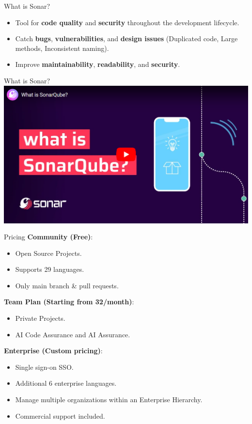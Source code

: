 \documentclass{beamer}
\begin{document}
\begin{frame}{What is Sonar?}
  \begin{itemize}
    \item Tool for \textbf{code quality} and \textbf{security} throughout the development lifecycle.
    \vspace*{0.75em}
    \item Catch \textbf{bugs}, \textbf{vulnerabilities}, and \textbf{design issues} 
    (Duplicated code, Large methods, Inconsistent naming).
    \vspace*{0.75em}
    \item Improve \textbf{maintainability}, \textbf{readability}, and \textbf{security}.
  \end{itemize}
\end{frame}

\begin{frame}{What is Sonar?}
  \href{https://youtu.be/xeTwG9XFFTE}{\includegraphics[scale=0.45]{fig/what_is_sonar_video.png}}
\end{frame}

\begin{frame}{Pricing}
  \textbf{Community (Free)}:
  \begin{itemize}
      \item Open Source Projects.
      \item Supports 29 languages.
      \item Only main branch \& pull requests.
  \end{itemize}
 
  \textbf{Team Plan (Starting from  32/month)}:
  \begin{itemize}
      \item Private Projects.
      \item AI Code Assurance and AI Assurance.
  \end{itemize}
 
  \textbf{Enterprise (Custom pricing)}:
  \begin{itemize}
      \item Single sign-on SSO.
      \item Additional 6 enterprise languages.
      \item Manage multiple organizations within an Enterprise Hierarchy.
      \item Commercial support included.
  \end{itemize}
\end{frame}
\end{document}

